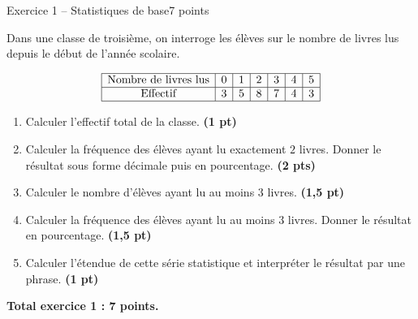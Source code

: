 \documentclass[11pt,a4paper]{article}
\newcommand{\pts}[1]{\hfill \textbf{(#1 pt)}}
\newcommand{\ptss}[1]{\hfill \textbf{(#1 pts)}}
\begin{document}
\begin{exercicebox}{Exercice 1 -- Statistiques de base}{7 points}

Dans une classe de troisième, on interroge les élèves sur le nombre de livres lus depuis le début de l’année scolaire.

\[
\begin{array}{|c|c|c|c|c|c|c|}
\hline
\text{Nombre de livres lus} & 0 & 1 & 2 & 3 & 4 & 5 \\
\hline
\text{Effectif} & 3 & 5 & 8 & 7 & 4 & 3 \\
\hline
\end{array}
\]

\begin{enumerate}
    \item Calculer l’effectif total de la classe. \pts{1}

    \item Calculer la fréquence des élèves ayant lu exactement $2$ livres. Donner le résultat sous forme décimale puis en pourcentage. \ptss{2}

    \item Calculer le nombre d’élèves ayant lu au moins $3$ livres. \pts{1,5}

    \item Calculer la fréquence des élèves ayant lu au moins $3$ livres. Donner le résultat en pourcentage. \pts{1,5}

    \item Calculer l’étendue de cette série statistique et interpréter le résultat par une phrase. \pts{1}
\end{enumerate}

\textbf{Total exercice 1 : 7 points.}

\end{exercicebox}
\end{document}
